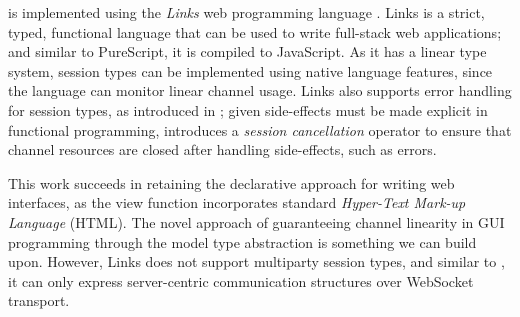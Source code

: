 \cite{MVU2020} is implemented using
the \textit{Links} web programming language
\cite{LINKS}. Links is a strict, typed, functional language
that can be used to write full-stack web applications;
and similar to PureScript, it is compiled to JavaScript.
As it has a linear type system, session types can be
implemented using native language features, since the
language can monitor linear channel usage.
Links also supports error handling for session types,
as introduced in \cite{Exceptional}; 
given side-effects must be made explicit
in functional programming, \cite{Exceptional} introduces
a \textit{session cancellation} operator to ensure
that channel resources are closed after handling
side-effects, such as errors.

This work succeeds in 
retaining the declarative approach for writing
web interfaces, as the view function incorporates standard
\textit{Hyper-Text Mark-up Language} (HTML).
The novel approach of guaranteeing channel linearity
in GUI programming through the model type abstraction
is something we can build upon. 
However, Links does not support multiparty session types,
and similar to \cite{PureScript2019},
it can only express server-centric communication structures
over WebSocket transport.